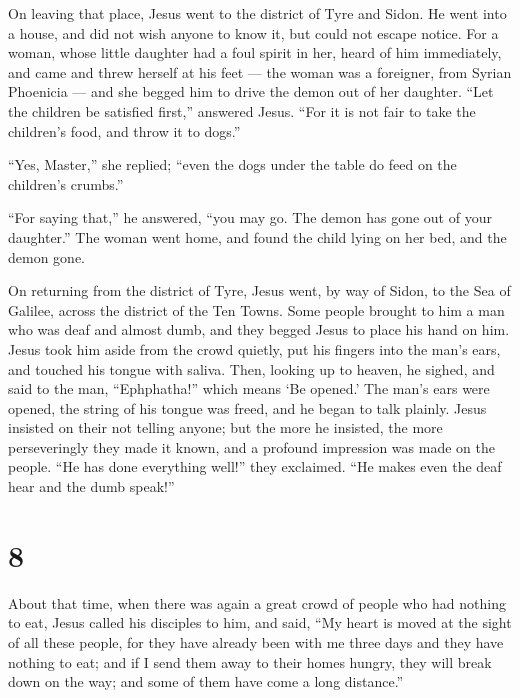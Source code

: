  On leaving that place, Jesus went to the district of Tyre
and Sidon. He went into a house, and did not wish anyone to know it, but
could not escape notice.  For a woman, whose little
daughter had a foul spirit in her, heard of him immediately, and came
and threw herself at his feet ---  the woman was a
foreigner, from Syrian Phoenicia --- and she begged him to drive the
demon out of her daughter.  ``Let the children be satisfied
first,'' answered Jesus. ``For it is not fair to take the children's
food, and throw it to dogs.''

 ``Yes, Master,'' she replied; ``even the dogs under the
table do feed on the children's crumbs.''

 ``For saying that,'' he answered, ``you may go. The demon
has gone out of your daughter.''  The woman went home, and
found the child lying on her bed, and the demon gone.

 On returning from the district of Tyre, Jesus went, by way
of Sidon, to the Sea of Galilee, across the district of the Ten Towns.
 Some people brought to him a man who was deaf and almost
dumb, and they begged Jesus to place his hand on him. 
Jesus took him aside from the crowd quietly, put his fingers into the
man's ears, and touched his tongue with saliva.  Then,
looking up to heaven, he sighed, and said to the man, ``Ephphatha!''
which means `Be opened.'  The man's ears were opened, the
string of his tongue was freed, and he began to talk plainly.
 Jesus insisted on their not telling anyone; but the more
he insisted, the more perseveringly they made it known, 
and a profound impression was made on the people. ``He has done
everything well!'' they exclaimed. ``He makes even the deaf hear and the
dumb speak!''

\hypertarget{section-7}{%
\section{8}\label{section-7}}

 About that time, when there was again a great crowd of
people who had nothing to eat, Jesus called his disciples to him, and
said,  ``My heart is moved at the sight of all these people,
for they have already been with me three days and they have nothing to
eat;  and if I send them away to their homes hungry, they
will break down on the way; and some of them have come a long
distance.''

